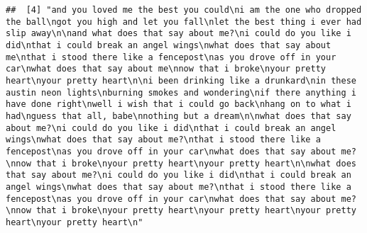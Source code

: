 \documentclass[]{article}
\begin{document}
\begin{verbatim}
##  [4] "and you loved me the best you could\ni am the one who dropped the ball\ngot you high and let you fall\nlet the best thing i ever had slip away\n\nand what does that say about me?\ni could do you like i did\nthat i could break an angel wings\nwhat does that say about me\nthat i stood there like a fencepost\nas you drove off in your car\nwhat does that say about me\nnow that i broke\nyour pretty heart\nyour pretty heart\n\ni been drinking like a drunkard\nin these austin neon lights\nburning smokes and wondering\nif there anything i have done right\nwell i wish that i could go back\nhang on to what i had\nguess that all, babe\nnothing but a dream\n\nwhat does that say about me?\ni could do you like i did\nthat i could break an angel wings\nwhat does that say about me?\nthat i stood there like a fencepost\nas you drove off in your car\nwhat does that say about me?\nnow that i broke\nyour pretty heart\nyour pretty heart\n\nwhat does that say about me?\ni could do you like i did\nthat i could break an angel wings\nwhat does that say about me?\nthat i stood there like a fencepost\nas you drove off in your car\nwhat does that say about me?\nnow that i broke\nyour pretty heart\nyour pretty heart\nyour pretty heart\nyour pretty heart\n"                                                                                                                                                                                                                                                                                                                                                                                                                                                                                                                                                                                                                                                                                                                                                                                                                                                                                                                                                                                                                                                                                                                                                                                                                                                                                                                                                                                                                                                                                                                                                                                                                                                                                   

\end{verbatim}
\end{document}
